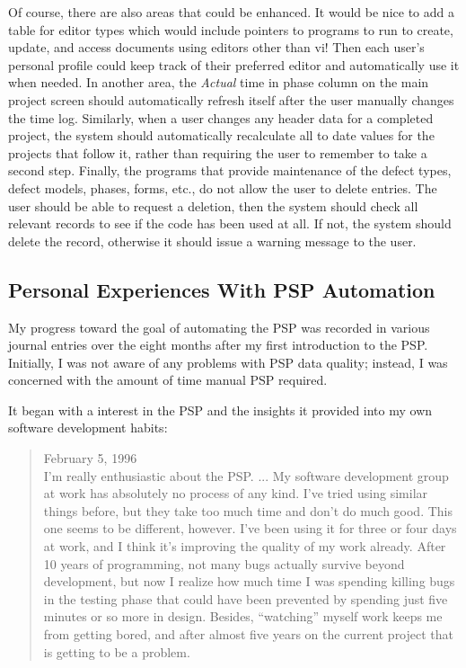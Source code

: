 Of course, there are also areas that could be enhanced.  It would be nice
to add a table for editor types which would include pointers to programs to
run to create, update, and access documents using editors other than vi!
Then each user's personal profile could keep track of their preferred
editor and automatically use it when needed.  In another area, the {\it
  Actual} time in phase column on the main project screen should
automatically refresh itself after the user manually changes the time log.
Similarly, when a user changes any header data for a completed project, the
system should automatically recalculate all to date values for the projects
that follow it, rather than requiring the user to remember to take a second
step.  Finally, the programs that provide maintenance of the defect types,
defect models, phases, forms, etc., do not allow the user to delete
entries.  The user should be able to request a deletion, then the system
should check all relevant records to see if the code has been used at all.
If not, the system should delete the record, otherwise it should issue a
warning message to the user.

\subsection{Personal Experiences With PSP Automation}
My progress toward the goal of automating the PSP was recorded in various
journal entries over the eight months after my first introduction to the
PSP. Initially, I was not aware of any problems with PSP data quality;
instead, I was concerned with the amount of time manual PSP required.

It began with a interest in the PSP and the insights it provided into my
own software development habits:
\begin{quote}
  February 5, 1996\\
  I'm really enthusiastic about the PSP. ...  My software development group
  at work has absolutely no process of any kind.  I've tried using similar
  things before, but they take too much time and don't do much good.  This
  one seems to be different, however.  I've been using it for three or four
  days at work, and I think it's improving the quality of my work already.
  After 10 years of programming, not many bugs actually survive beyond
  development, but now I realize how much time I was spending killing bugs
  in the testing phase that could have been prevented by spending just five
  minutes or so more in design.  Besides, ``watching'' myself work keeps me
  from getting bored, and after almost five years on the current project
  that is getting to be a problem.
\end{quote}

